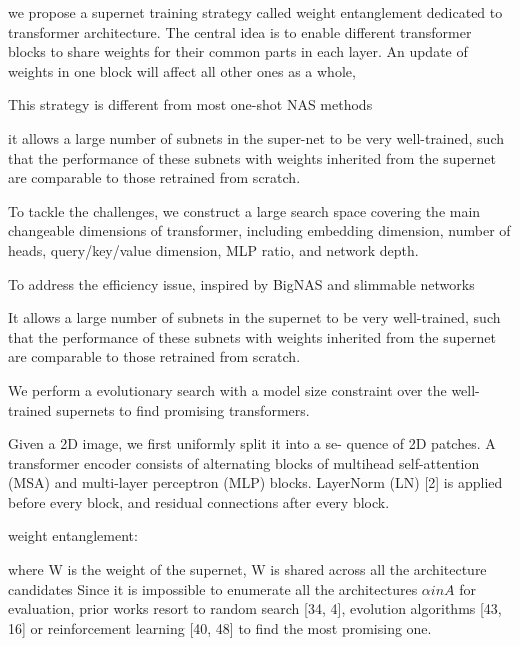 \documentclass[8pt,UTF8]{article}
\begin{document}
            we propose a supernet training strategy called weight entanglement dedicated to transformer architecture. The central idea is to enable different transformer blocks to share weights for their common parts in each layer. An update of weights in one block will affect all other ones as a whole,
            
            This strategy is different from most one-shot NAS methods \cite{guo2020single, chu2021fairnas, wu2019fbnet}
            
            it allows a large number of subnets in the super-net to be very well-trained, such that the performance of these subnets with weights inherited from the supernet are comparable to those retrained from scratch.
            
            To tackle the challenges, we construct a large search space covering the main changeable dimensions of transformer, including embedding dimension, number of heads, query/key/value dimension, MLP ratio, and network depth.
            
            To address the efficiency issue, inspired by BigNAS \cite{yu2020bignas} and slimmable networks \cite{yu2020bignas, yu2018slimmable}
            
            It allows a large number of subnets in the supernet to be very well-trained, such that the performance of these subnets with weights inherited from the supernet are comparable to those retrained from scratch.
            
            We perform a evolutionary search with a model size constraint over the well-trained supernets to find promising transformers.
            
            Given a 2D image, we first uniformly split it into a se- quence of 2D patches. A transformer encoder consists of alternating blocks of multihead self-attention (MSA) and multi-layer perceptron (MLP) blocks. LayerNorm (LN) [2] is applied before every block, and residual connections after every block.
            
            weight entanglement:
            
            where W is the weight of the supernet, W is shared across all the architecture candidates
            Since it is impossible to enumerate all the architectures $\alpha in A$ for evaluation, prior works resort to random search [34, 4], evolution algorithms [43, 16] or reinforcement learning [40, 48] to find the most promising one.
            
\end{document}

